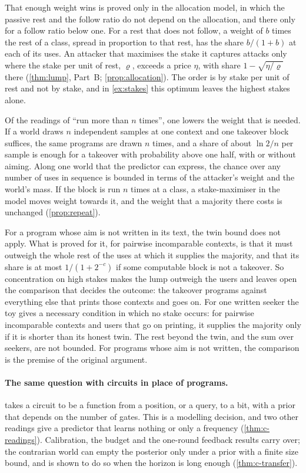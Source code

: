 That enough weight wins is proved only in the allocation model, in which the passive rest and the follow
ratio do not depend on the allocation, and there only for a follow ratio below one. For a rest that does not
follow, a weight of $b$ times the rest of a
class, spread in proportion to that rest, has the share $b/(1+b)$ at each of its uses. An attacker that
maximises the stake it captures attacks only where the stake per unit of rest, $\varrho$, exceeds a price
$\eta$, with share $1-\sqrt{\eta/\varrho}$ there (\cref{thm:lump}, Part~B; \cref{prop:allocation}). The order
is by stake per unit of rest and not by stake, and in \cref{ex:stakes} this optimum leaves the highest stakes
alone.

Of the readings of ``run more than $n$ times'', one lowers the weight that is needed. If a world draws $n$
independent samples at one context and one takeover block suffices, the same programs are drawn $n$ times,
and a share of about $\ln2/n$ per sample is enough for a takeover with probability above one half, with or
without aiming. Along one world that the predictor can express, the chance over any number of uses in
sequence is bounded in terms of the attacker's weight and the world's mass. If the block is run $n$ times at
a class, a stake-maximiser in the model moves weight towards it, and the weight that a majority there costs
is unchanged (\cref{prop:repeat}).

For a program whose aim is not written in its text, the twin bound does not apply. What is proved for it, for
pairwise incomparable contexts, is that it must outweigh the whole rest of the uses at which it supplies the
majority, and that its share is at most $1/(1+2^{-c})$ if some computable block is not a takeover. So
concentration on high stakes makes the lump outweigh the users and leaves open the comparison that decides
the outcome: the takeover programs against everything else that prints those contexts and goes on. For one
written seeker the toy gives a necessary condition in which no stake occurs: for pairwise incomparable
contexts and users that go on printing, it supplies the majority only if it is shorter than its honest twin.
The rest beyond the twin, and the sum
over seekers, are not bounded. For programs whose aim is not written, the comparison is the premise of the
original argument.

\paragraph{The same question with circuits in place of programs.}  takes a circuit to be
a function from a position, or a query, to a bit, with a prior that depends on the number of gates. This is a
modelling decision, and two other readings give a predictor that learns nothing or only a frequency
(\cref{thm:c-readings}). Calibration, the budget and the one-round feedback results carry over; the
contrarian world can empty the posterior only under a prior with a finite size bound, and is shown to do so
when the horizon is long enough (\cref{thm:c-transfer}).

